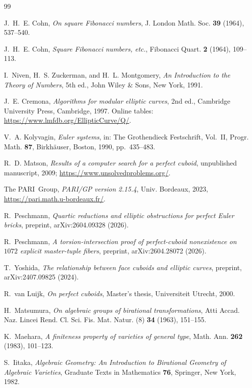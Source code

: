 \documentclass[11pt,reqno]{amsart}
\theoremstyle{plain}
\theoremstyle{definition}
\begin{document}
\begin{thebibliography}{99}

J.~H.~E. Cohn,
\emph{On square Fibonacci numbers},
J. London Math. Soc. \textbf{39} (1964), 537--540.

J.~H.~E. Cohn,
\emph{Square Fibonacci numbers, etc.},
Fibonacci Quart. \textbf{2} (1964), 109--113.

I.~Niven, H.~S. Zuckerman, and H.~L. Montgomery,
\emph{An Introduction to the Theory of Numbers},
5th ed., John Wiley \& Sons, New York, 1991.

J.~E. Cremona,
\emph{Algorithms for modular elliptic curves},
2nd ed., Cambridge University Press, Cambridge, 1997.
Online tables: \url{https://www.lmfdb.org/EllipticCurve/Q/}.

V.~A. Kolyvagin,
\emph{Euler systems},
in: The Grothendieck Festschrift, Vol.~II,
Progr. Math. \textbf{87}, Birkh\"auser, Boston, 1990, pp.~435--483.

R.~D. Matson,
\emph{Results of a computer search for a perfect cuboid},
unpublished manuscript, 2009;
\url{https://www.unsolvedproblems.org/}.

The PARI~Group,
\emph{PARI/GP version 2.15.4},
Univ. Bordeaux, 2023,
\url{https://pari.math.u-bordeaux.fr/}.

R.~Peschmann,
\emph{Quartic reductions and elliptic obstructions for perfect Euler bricks},
preprint, arXiv:2604.09328 (2026).

R.~Peschmann,
\emph{A torsion-intersection proof of perfect-cuboid nonexistence on $1072$
explicit master-tuple fibers},
preprint, arXiv:2604.28072 (2026).

T.~Yoshida,
\emph{The relationship between face cuboids and elliptic curves},
preprint, arXiv:2407.09825 (2024).

R.~van Luijk,
\emph{On perfect cuboids},
Master's thesis, Universiteit Utrecht, 2000.

H.~Matsumura,
\emph{On algebraic groups of birational transformations},
Atti Accad. Naz. Lincei Rend. Cl. Sci. Fis. Mat. Natur. (8) \textbf{34} (1963),
151--155.

K.~Maehara,
\emph{A finiteness property of varieties of general type},
Math. Ann. \textbf{262} (1983), 101--123.

S.~Iitaka,
\emph{Algebraic Geometry: An Introduction to Birational Geometry of Algebraic
Varieties},
Graduate Texts in Mathematics \textbf{76}, Springer, New York, 1982.


\end{thebibliography}
\end{document}
